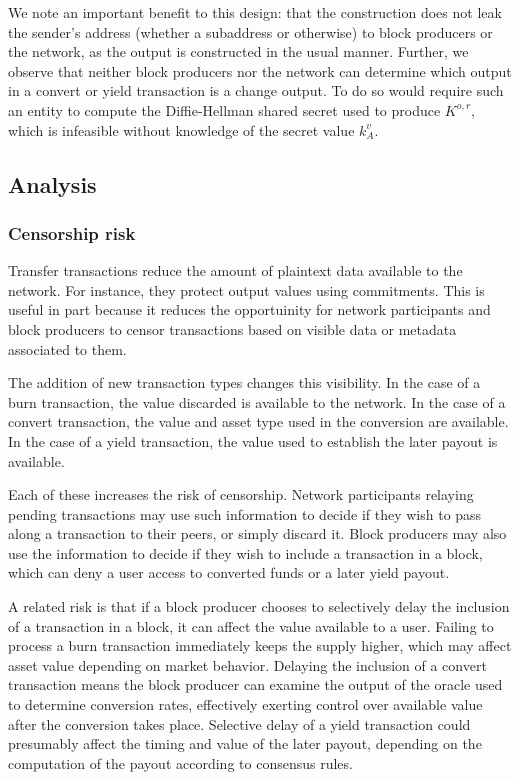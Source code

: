 \documentclass{article}
\begin{document}
We note an important benefit to this design: that the construction does not leak the sender's address (whether a subaddress or otherwise) to block producers or the network, as the output is constructed in the usual manner.
Further, we observe that neither block producers nor the network can determine which output in a convert or yield transaction is a change output.
To do so would require such an entity to compute the Diffie-Hellman shared secret used to produce $K^{o,r}$, which is infeasible without knowledge of the secret value $k_A^v$.


\subsection{Analysis}


\subsubsection{Censorship risk}

Transfer transactions reduce the amount of plaintext data available to the network.
For instance, they protect output values using commitments.
This is useful in part because it reduces the opportuinity for network participants and block producers to censor transactions based on visible data or metadata associated to them.

The addition of new transaction types changes this visibility.
In the case of a burn transaction, the value discarded is available to the network.
In the case of a convert transaction, the value and asset type used in the conversion are available.
In the case of a yield transaction, the value used to establish the later payout is available.

Each of these increases the risk of censorship.
Network participants relaying pending transactions may use such information to decide if they wish to pass along a transaction to their peers, or simply discard it.
Block producers may also use the information to decide if they wish to include a transaction in a block, which can deny a user access to converted funds or a later yield payout.

A related risk is that if a block producer chooses to selectively delay the inclusion of a transaction in a block, it can affect the value available to a user.
Failing to process a burn transaction immediately keeps the supply higher, which may affect asset value depending on market behavior.
Delaying the inclusion of a convert transaction means the block producer can examine the output of the oracle used to determine conversion rates, effectively exerting control over available value after the conversion takes place.
Selective delay of a yield transaction could presumably affect the timing and value of the later payout, depending on the computation of the payout according to consensus rules.
\end{document}
